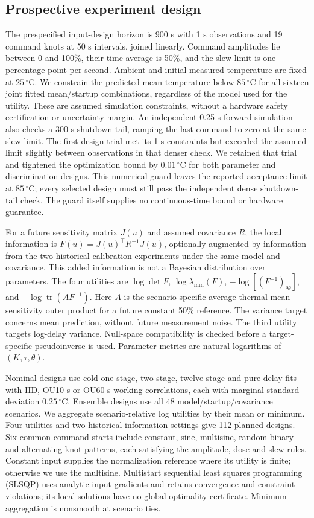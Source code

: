 \subsection{Prospective experiment design}
The prespecified input-design horizon is 900 s with 1 s observations and 19
command knots at 50 s intervals, joined linearly. Command amplitudes lie between
0 and 100\%, their time average is 50\%, and the slew limit is one percentage
point per second. Ambient and initial measured temperature are fixed at
$25\,{}^\circ\mathrm C$. We constrain the predicted mean temperature below
$85\,{}^\circ\mathrm C$ for all sixteen joint fitted mean/startup combinations,
regardless of the model used for the utility. These are assumed simulation
constraints, without a hardware safety certification or uncertainty margin.
An independent 0.25 s forward simulation also checks a 300 s shutdown tail,
ramping the last command to zero at the same slew limit.
The first design trial met its 1 s constraints but exceeded the assumed limit
slightly between observations in that denser check. We retained that trial
and tightened the optimization bound by $0.01\,{}^\circ\mathrm C$ for both
parameter and discrimination designs. This numerical guard leaves the reported
acceptance limit at $85\,{}^\circ\mathrm C$; every selected design must still
pass the independent dense shutdown-tail check. The guard itself supplies no
continuous-time bound or hardware guarantee.

For a future sensitivity matrix $J(u)$ and assumed covariance $R$, the local
information is $F(u)=J(u)^\top R^{-1}J(u)$, optionally augmented by information
from the two historical calibration experiments under the same model and
covariance. This added information is not a Bayesian distribution over
parameters. The four utilities are $\log\det F$, $\log\lambda_{\min}(F)$,
$-\log[(F^{-1})_{\theta\theta}]$, and
$-\log\operatorname{tr}(A F^{-1})$. Here $A$ is the scenario-specific average
thermal-mean sensitivity outer product for a future constant 50\% reference.
The variance target concerns mean prediction, without future measurement noise.
The third utility targets log-delay variance.
Null-space compatibility is checked before a target-specific pseudoinverse is
used. Parameter metrics are natural logarithms of $(K,\tau,\theta)$.

Nominal designs use cold one-stage, two-stage, twelve-stage and pure-delay
fits with IID, OU10 s or OU60 s working correlations, each with marginal
standard deviation $0.25\,{}^\circ\mathrm C$. Ensemble designs use all 48
model/startup/covariance scenarios. We aggregate scenario-relative log utilities
by their mean or minimum. Four utilities and two historical-information settings
give 112 planned designs. Six common command starts include constant, sine,
multisine, random binary and alternating knot patterns, each satisfying the
amplitude, dose and slew rules. Constant input supplies the normalization
reference where its utility is finite; otherwise we use the multisine.
Multistart sequential least squares programming (SLSQP) uses
analytic input gradients and retains convergence and constraint violations;
its local solutions have no global-optimality certificate. Minimum aggregation
is nonsmooth at scenario ties.

